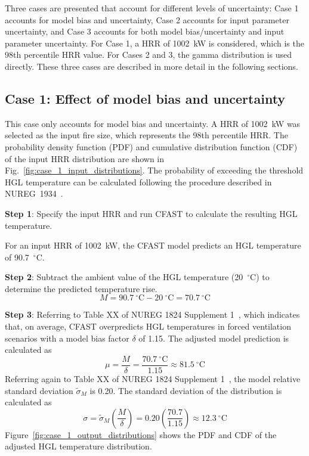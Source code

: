 \documentclass[12pt]{article}
\begin{document}
Three cases are presented that account for different levels of uncertainty: Case 1 accounts for model bias and uncertainty, Case 2 accounts for input parameter uncertainty, and Case 3 accounts for both model bias/uncertainty and input parameter uncertainty. For Case 1, a HRR of 1002~kW is considered, which is the 98th percentile HRR value. For Cases 2 and 3, the gamma distribution is used directly. These three cases are described in more detail in the following sections.



\clearpage


\subsection{Case 1: Effect of model bias and uncertainty}

This case only accounts for model bias and uncertainty. A HRR of 1002~kW was selected as the input fire size, which represents the 98th percentile HRR. The probability density function (PDF) and cumulative distribution function (CDF) of the input HRR distribution are shown in Fig.~\ref{fig:case_1_input_distributions}. The probability of exceeding the threshold HGL temperature can be calculated following the procedure described in NUREG~1934~\cite{NUREG_1934}.

\textbf{Step 1}: Specify the input HRR and run CFAST to calculate the resulting HGL temperature.

For an input HRR of 1002~kW, the CFAST model predicts an HGL temperature of 90.7~$^\circ$C.

\textbf{Step 2}: Subtract the ambient value of the HGL temperature (20~$^\circ$C) to determine the predicted temperature rise.
\begin{equation}
M = 90.7~^\circ\textrm{C} - 20~^\circ\textrm{C} = 70.7~^\circ\textrm{C}
\end{equation}

\textbf{Step 3}: Referring to Table XX of NUREG 1824 Supplement 1~\cite{NUREG_1824_Sup_1}, which indicates that, on average, CFAST overpredicts HGL temperatures in forced ventilation scenarios with a model bias factor $\delta$ of 1.15. The adjusted model prediction is calculated as
\begin{equation}
\mu = \frac{M}{\delta} = \frac{70.7~^\circ\textrm{C}}{1.15} \approx 81.5~^\circ\textrm{C}
\end{equation}
Referring again to Table XX of NUREG 1824 Supplement 1~\cite{NUREG_1824_Sup_1}, the model relative standard deviation $\widetilde\sigma_M$ is 0.20. The standard deviation of the distribution is calculated as
\begin{equation}
\sigma = \widetilde\sigma_M \left( \frac{M}{\delta} \right) = 0.20 \left( \frac{70.7}{1.15} \right) \approx 12.3~^\circ\textrm{C}
\end{equation}
Figure~\ref{fig:case_1_output_distributions} shows the PDF and CDF of the adjusted HGL temperature distribution.
\end{document}
